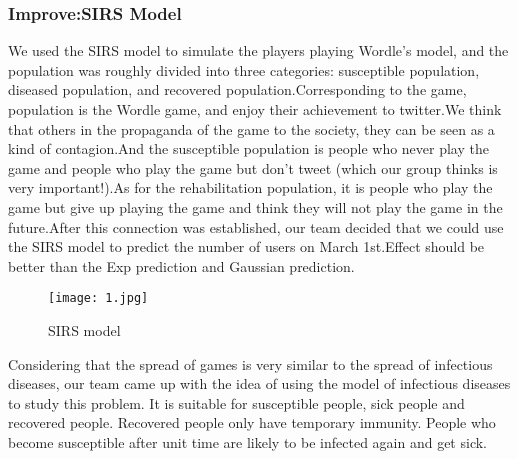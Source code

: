 \documentclass[12pt]{article}  %
\begin{document}
\subsubsection{Improve:SIRS Model}


We used the SIRS model to simulate the players playing Wordle's model, and the population was roughly divided into three categories: susceptible population, diseased population, and recovered population.Corresponding to the game, population is the Wordle game, and enjoy their achievement to twitter.We think that others in the propaganda of the game to the society, they can be seen as a kind of contagion.And the susceptible population is people who never play the game and people who play the game but don't tweet (which our group thinks is very important!).As for the rehabilitation population, it is people who play the game but give up playing the game and think they will not play the game in the future.After this connection was established, our team decided that we could use the SIRS model to predict the number of users on March 1st.Effect should be better than the Exp prediction and Gaussian prediction.


\begin{figure}[htbp]
	\centering
	\texttt{[image: 1.jpg]}
	\caption{SIRS model}\label{fig:result}
\end{figure}



Considering that the spread of games is very similar to the spread of infectious diseases, our team came up with the idea of using the model of infectious diseases to study this problem.
It is suitable for susceptible people, sick people and recovered people. Recovered people only have temporary immunity. People who become susceptible after unit time are likely to be infected again and get sick.
\end{document}
